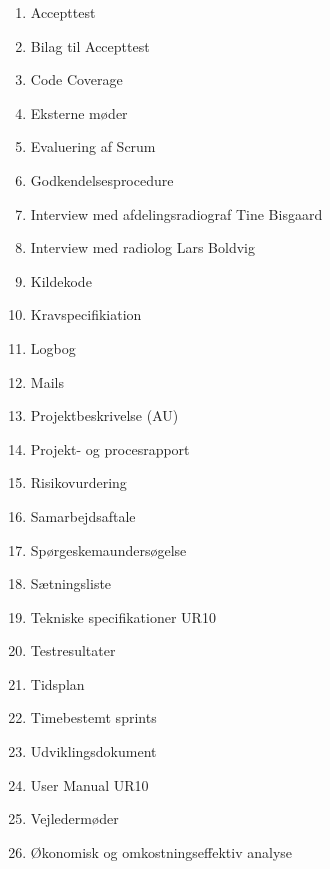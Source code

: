 \begin{enumerate}
\item Accepttest 					 		\label{Accepttest}
\item Bilag til Accepttest						\label{BilagAccepttest}
\item Code Coverage 						\label{Code Coverage}
\item Eksterne møder						\label{Eksterne moder} 
\item Evaluering af Scrum 						\label{Evaluering Scrum} 
\item Godkendelsesprocedure 					\label{Godkendelsesprocedure}
\item Interview med afdelingsradiograf Tine Bisgaard 	\label{Tine}
\item Interview med radiolog Lars Boldvig  			\label{Telefoninterview}
\item Kildekode							\label{Kildekode} 
\item Kravspecifikiation 						\label{Kravspecifikation}
\item Logbog								\label{Logbog}
\item Mails								\label{Mails}
\item Projektbeskrivelse (AU) 					\label{Projektbeskrivelse}
\item Projekt- og procesrapport 					\label{Projekt- og procesrapport}
\item Risikovurdering 						\label{Risikovurdering} 
\item Samarbejdsaftale						\label{Samarbejdesaftale} 
\item Spørgeskemaundersøgelse 					\label{Sporgeskemaundersogelse}
\item Sætningsliste 							\label{Satningsliste}
\item Tekniske specifikationer UR10				\label{UR10spec}
\item Testresultater 						\label{TestResultater}
\item Tidsplan							\label{Tidsplan}
\item Timebestemt sprints 						\label{Timebestemt sprints}
\item Udviklingsdokument 						\label{Udviklingsdokument}
\item User Manual UR10 						\label{UserManualUR10}
\item Vejledermøder						\label{Vejledermoder}
\item Økonomisk og omkostningseffektiv analyse		\label{Okonomi}
\end{enumerate}

